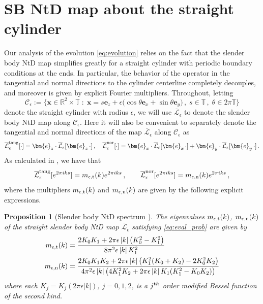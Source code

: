 \documentclass[11pt,reqno]{amsart}
\newcommand{\R}{\mathbb{R}}
\newcommand{\T}{\mathbb{T}}
\newcommand{\bx}{\bm{x}}
\newcommand{\be}{\bm{e}}
\newcommand{\abs}[1]{\left\lvert #1 \right\rvert}
\newcommand{\mc}[1]{\mathcal{#1}}
\newtheorem{proposition}[theorem]{Proposition}
\theoremstyle{definition}
\begin{document}
\section{SB NtD map about the straight cylinder}\label{sec:straight}
Our analysis of the evolution \eqref{eq:evolution} relies on the fact that the slender body NtD map simplifies greatly for a straight cylinder with periodic boundary conditions at the ends. In particular, the behavior of the operator in the tangential and normal directions to the cylinder centerline completely decouples, and moreover is given by explicit Fourier multipliers. 
Throughout, letting 
\begin{equation}\label{eq:Cepsilon} 
\mc{C}_\epsilon :=  \big\{\bx\in \R^2\times\T \; : \; \bx = s\be_z + \epsilon\big(\cos\theta\be_x+\sin\theta\be_y\big)\,,  \; s\in\T\,, \; \theta\in2\pi\T \big\}
\end{equation}
denote the straight cylinder with radius $\epsilon$, we will use $\overline{\mc{L}}_\epsilon$ to denote the slender body NtD map along $\mc{C}_\epsilon$. Here it will also be convenient to separately denote the tangential and normal directions of the map $\overline{\mc{L}}_\epsilon$ along $\mc{C}_\epsilon$ as
\begin{equation}\label{eq:tang_and_nor}
  \overline{\mc{L}}_\epsilon^{\rm tang}[\cdot] = \be_z\cdot\overline{\mc{L}}_\epsilon [\be_z\,\cdot]\,, \quad 
  \overline{\mc{L}}_\epsilon^{\rm nor}[\cdot] = \be_x\cdot\overline{\mc{L}}_\epsilon [\be_x\,\cdot] + \be_y\cdot\overline{\mc{L}}_\epsilon [\be_y\,\cdot]\,.
\end{equation} 
%
%
As calculated in \cite{inverse}, we have that 
\begin{equation}\label{eq:eval_prob}
\overline{\mc{L}}_\epsilon^{\rm tang}[e^{2\pi iks}] = m_{\epsilon,{\rm t}}(k)e^{2\pi iks}\,, \qquad 
\overline{\mc{L}}_\epsilon^{\rm nor}[e^{2\pi iks}] = m_{\epsilon,{\rm n}}(k)e^{2\pi iks}\,, 
\end{equation} 
where the multipliers $m_{\epsilon,{\rm t}}(k)$ and $m_{\epsilon,{\rm n}}(k)$ are given by the following explicit expressions.
%
%
\begin{proposition}[Slender body NtD spectrum \cite{inverse}]\label{prop:Leps_spectrum}
The eigenvalues $m_{\epsilon,{\rm t}}(k)$, $m_{\epsilon,{\rm n}}(k)$ of the straight slender body NtD map $\overline{\mc{L}}_\epsilon$ satisfying \eqref{eq:eval_prob} are given by
\begin{align}
\label{eq:eigsT}
m_{\epsilon,{\rm t}}(k) &= \frac{2K_0K_1 + 2\pi\epsilon \abs{k} \big( K_0^2 - K_1^2 \big) }{ 8\pi^2\epsilon \abs{k} K_1^2} \\
%
\label{eq:eigsN}
m_{\epsilon,{\rm n}}(k) &= 
\frac{2K_0K_1K_2 + 2\pi\epsilon \abs{k} \big(K_1^2(K_0+K_2)-2K_0^2K_2 \big)}{4\pi^2\epsilon \abs{k}\big(4K_1^2K_2+2\pi\epsilon \abs{k} K_1(K_1^2-K_0K_2)\big)}
\end{align}
where each $K_j=K_j(2\pi\epsilon \abs{k})$, $j=0,1,2$, is a $j^{\text th}$ order modified Bessel function of the second kind. 
\end{proposition}
\end{document}
